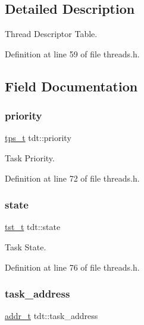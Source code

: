 \subsection{Detailed Description}
Thread Descriptor Table. 

Definition at line 59 of file threads.\+h.



\subsection{Field Documentation}
\mbox{\label{a00107_a1f6b2208cd30a76a918127077652ef40_a1f6b2208cd30a76a918127077652ef40}} 
\subsubsection{\texorpdfstring{priority}{priority}}
{\footnotesize\ttfamily \hyperlink{a00065_a5ee504524d7b79ed81a1ed7b325dc9c6_a5ee504524d7b79ed81a1ed7b325dc9c6}{tps\+\_\+t} tdt\+::priority}



Task Priority. 



Definition at line 72 of file threads.\+h.

\mbox{\label{a00107_ac2427b4d11139de3da5e735a9c1c5299_ac2427b4d11139de3da5e735a9c1c5299}} 
\subsubsection{\texorpdfstring{state}{state}}
{\footnotesize\ttfamily \hyperlink{a00065_a3895f03bb811310833570ff0b8a403d9_a3895f03bb811310833570ff0b8a403d9}{tst\+\_\+t} tdt\+::state}



Task State. 



Definition at line 76 of file threads.\+h.

\mbox{\label{a00107_ad81f2cd346c1134e82393226d2f1852b_ad81f2cd346c1134e82393226d2f1852b}} 
\subsubsection{\texorpdfstring{task\+\_\+address}{task\_address}}
{\footnotesize\ttfamily \hyperlink{a00068_a295f71165288684c38c6bb836fbb3c59_a295f71165288684c38c6bb836fbb3c59}{addr\+\_\+t} tdt\+::task\+\_\+address}



